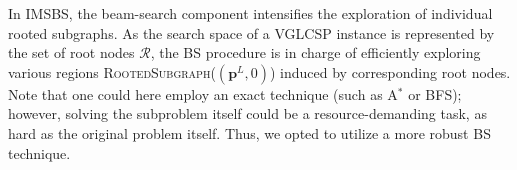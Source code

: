 \documentclass[runningheads]{llncs}
\begin{document}
	
	In IMSBS, the beam-search component intensifies the exploration of individual rooted subgraphs. As the search space of a VGLCSP instance is represented by the set of root nodes $\mathcal{R}$, the BS procedure is in charge of efficiently exploring various  regions \textsc{RootedSubgraph}($(\mathbf{p}^L, 0)$) induced by corresponding root nodes. Note that one could here employ an exact technique (such as A$^*$ or BFS); however, solving the subproblem itself could be a resource-demanding task, as hard as the original problem itself. Thus, we opted to utilize a more robust BS technique.  
	
	
	
\end{document}
